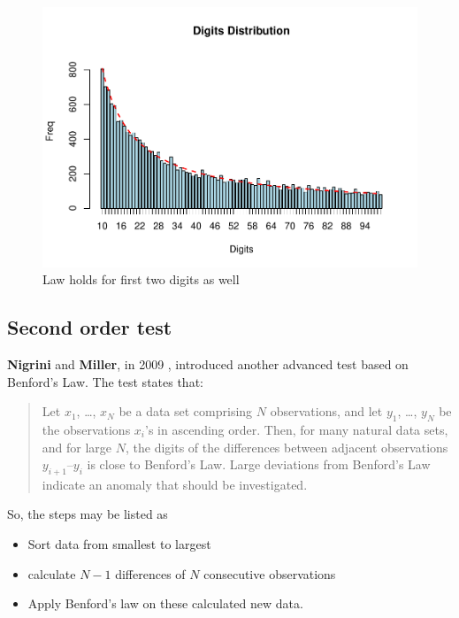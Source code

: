 \documentclass[
]{book}
\providecommand{\tightlist}{%
  \setlength{\itemsep}{0pt}\setlength{\parskip}{0pt}}
\begin{document}
\begin{figure}

{\centering \includegraphics{DauR_files/figure-latex/ben2-1} 

}

\caption{Law holds for first two digits as well}\label{fig:ben2}
\end{figure}

\hypertarget{second-order-test}{%
\subsection{Second order test}\label{second-order-test}}

\textbf{Nigrini} and \textbf{Miller}, in 2009 \citep{article2009}, introduced another advanced test based on Benford's Law. The test states that:

\begin{quote}
Let \(x_1\), \ldots, \(x_N\) be a data set comprising \(N\) observations, and let \(y_1\), \ldots, \(y_N\) be the observations \(x_i\)'s in ascending order. Then, for many natural data sets, and for large \(N\), the digits of the differences between adjacent observations \(y_{i+1} – y_i\) is close to Benford's Law. Large deviations from Benford's Law indicate an anomaly that should be investigated.
\end{quote}

So, the steps may be listed as

\begin{itemize}
\tightlist
\item
  Sort data from smallest to largest
\item
  calculate \(N-1\) differences of \(N\) consecutive observations
\item
  Apply Benford's law on these calculated new data.
\end{itemize}
\end{document}
